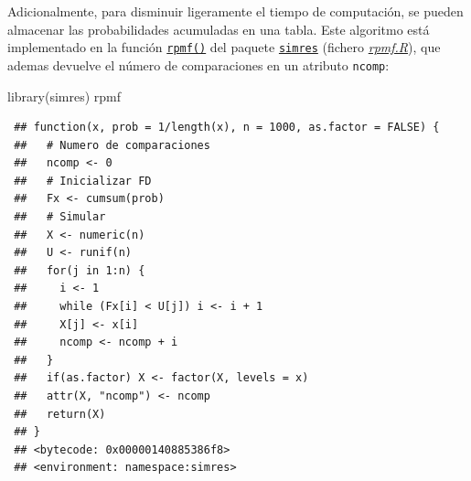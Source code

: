 \documentclass[
]{book}
\newenvironment{Shaded}{\begin{snugshade}}{\end{snugshade}}
\newcommand{\FunctionTok}[1]{\textcolor[rgb]{0.00,0.00,0.00}{#1}}
\newcommand{\NormalTok}[1]{#1}
\theoremstyle{break}
\theoremstyle{nonumberplain}
\begin{document}
Adicionalmente, para disminuir ligeramente el tiempo de computación, se pueden almacenar las probabilidades acumuladas en una tabla.
Este algoritmo está implementado en la función \href{https://rubenfcasal.github.io/simres/reference/rpmf.html}{\texttt{rpmf()}} del paquete \href{https://rubenfcasal.github.io/simres}{\texttt{simres}} (fichero \href{R/rpmf.R}{\emph{rpmf.R}}), que ademas devuelve el número de comparaciones en un atributo \texttt{ncomp}:

\begin{Shaded}
\begin{Highlighting}[]
\FunctionTok{library}\NormalTok{(simres)}
\NormalTok{rpmf}
\end{Highlighting}
\end{Shaded}

\begin{verbatim}
 ## function(x, prob = 1/length(x), n = 1000, as.factor = FALSE) {
 ##   # Numero de comparaciones
 ##   ncomp <- 0
 ##   # Inicializar FD
 ##   Fx <- cumsum(prob)
 ##   # Simular
 ##   X <- numeric(n)
 ##   U <- runif(n)
 ##   for(j in 1:n) {
 ##     i <- 1
 ##     while (Fx[i] < U[j]) i <- i + 1
 ##     X[j] <- x[i]
 ##     ncomp <- ncomp + i
 ##   }
 ##   if(as.factor) X <- factor(X, levels = x)
 ##   attr(X, "ncomp") <- ncomp
 ##   return(X)
 ## }
 ## <bytecode: 0x00000140885386f8>
 ## <environment: namespace:simres>
\end{verbatim}
\end{document}
